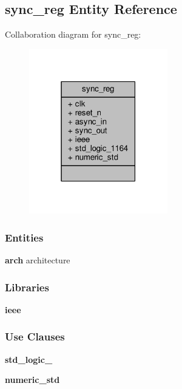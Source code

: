\subsection{sync\+\_\+reg Entity Reference}
\label{classsync__reg}


Collaboration diagram for sync\+\_\+reg\+:\nopagebreak
\begin{figure}[H]
\begin{center}
\leavevmode
\includegraphics[width=171pt]{d0/d2c/classsync__reg__coll__graph}
\end{center}
\end{figure}
\subsubsection*{Entities}
\begin{DoxyCompactItemize}
\item 
{\bf arch} architecture
\end{DoxyCompactItemize}
\subsubsection*{Libraries}
 \begin{DoxyCompactItemize}
\item 
{\bf ieee} 
\end{DoxyCompactItemize}
\subsubsection*{Use Clauses}
 \begin{DoxyCompactItemize}
\item 
{\bf std\+\_\+logic\+\_}   
\item 
{\bf numeric\+\_\+std}   
\end{DoxyCompactItemize}
